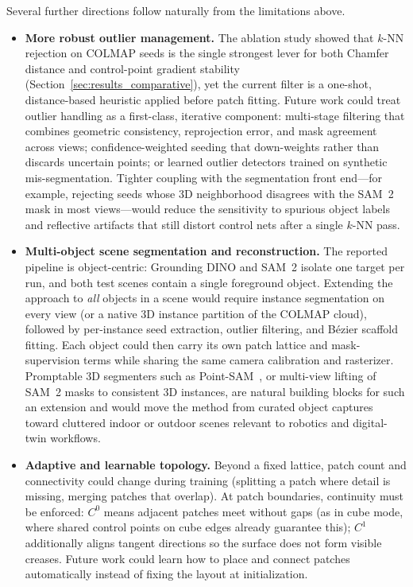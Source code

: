 \documentclass{report}
\begin{document}
Several further directions follow naturally from the limitations above.

\begin{itemize}
    \item \textbf{More robust outlier management.} The ablation study showed that $k$-NN rejection on COLMAP seeds is the single strongest lever for both Chamfer distance and control-point gradient stability (Section~\ref{sec:results_comparative}), yet the current filter is a one-shot, distance-based heuristic applied before patch fitting. Future work could treat outlier handling as a first-class, iterative component: multi-stage filtering that combines geometric consistency, reprojection error, and mask agreement across views; confidence-weighted seeding that down-weights rather than discards uncertain points; or learned outlier detectors trained on synthetic mis-segmentation. Tighter coupling with the segmentation front end---for example, rejecting seeds whose 3D neighborhood disagrees with the SAM~2 mask in most views---would reduce the sensitivity to spurious object labels and reflective artifacts that still distort control nets after a single $k$-NN pass.
    \item \textbf{Multi-object scene segmentation and reconstruction.} The reported pipeline is object-centric: Grounding DINO and SAM~2 isolate one target per run, and both test scenes contain a single foreground object. Extending the approach to \emph{all} objects in a scene would require instance segmentation on every view (or a native 3D instance partition of the COLMAP cloud), followed by per-instance seed extraction, outlier filtering, and B\'ezier scaffold fitting. Each object could then carry its own patch lattice and mask-supervision terms while sharing the same camera calibration and rasterizer. Promptable 3D segmenters such as Point-SAM~\cite{zhou2025pointsam}, or multi-view lifting of SAM~2 masks to consistent 3D instances, are natural building blocks for such an extension and would move the method from curated object captures toward cluttered indoor or outdoor scenes relevant to robotics and digital-twin workflows.
    \item \textbf{Adaptive and learnable topology.} Beyond a fixed lattice, patch count and connectivity could change during training (splitting a patch where detail is missing, merging patches that overlap). At patch boundaries, continuity must be enforced: $C^0$ means adjacent patches meet without gaps (as in cube mode, where shared control points on cube edges already guarantee this); $C^1$ additionally aligns tangent directions so the surface does not form visible creases. Future work could learn how to place and connect patches automatically instead of fixing the layout at initialization.

\end{itemize}
\end{document}
